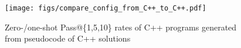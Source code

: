\begin{figure}
    \hspace{-8pt}\texttt{[image: figs/compare\_config\_from\_C++\_to\_C++.pdf]}
    \vspace{-0.3cm}
    \caption{Zero-/one-shot Pass@\{1,5,10\} rates of C++ programs generated from pseudocode of C++ solutions}
    \label{fig:passk}
\end{figure}
